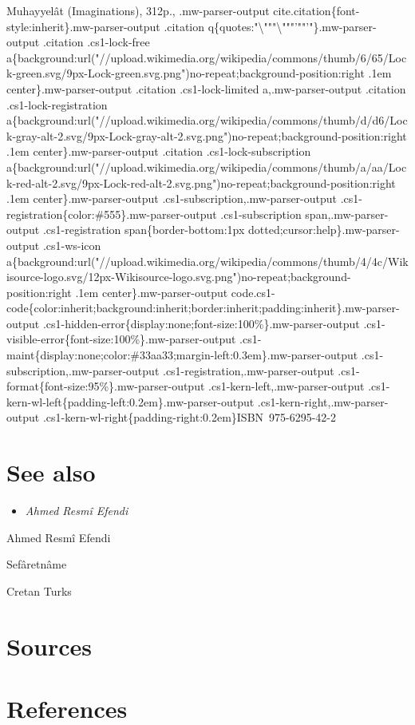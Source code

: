 Muhayyelât (Imaginations), 312p., .mw-parser-output
cite.citation\{font-style:inherit\}.mw-parser-output .citation
q\{quotes:"\textbackslash{}"""\textbackslash{}"""'""'"\}.mw-parser-output
.citation .cs1-lock-free
a\{background:url("//upload.wikimedia.org/wikipedia/commons/thumb/6/65/Lock-green.svg/9px-Lock-green.svg.png")no-repeat;background-position:right
.1em center\}.mw-parser-output .citation .cs1-lock-limited
a,.mw-parser-output .citation .cs1-lock-registration
a\{background:url("//upload.wikimedia.org/wikipedia/commons/thumb/d/d6/Lock-gray-alt-2.svg/9px-Lock-gray-alt-2.svg.png")no-repeat;background-position:right
.1em center\}.mw-parser-output .citation .cs1-lock-subscription
a\{background:url("//upload.wikimedia.org/wikipedia/commons/thumb/a/aa/Lock-red-alt-2.svg/9px-Lock-red-alt-2.svg.png")no-repeat;background-position:right
.1em center\}.mw-parser-output .cs1-subscription,.mw-parser-output
.cs1-registration\{color:\#555\}.mw-parser-output .cs1-subscription
span,.mw-parser-output .cs1-registration span\{border-bottom:1px
dotted;cursor:help\}.mw-parser-output .cs1-ws-icon
a\{background:url("//upload.wikimedia.org/wikipedia/commons/thumb/4/4c/Wikisource-logo.svg/12px-Wikisource-logo.svg.png")no-repeat;background-position:right
.1em center\}.mw-parser-output
code.cs1-code\{color:inherit;background:inherit;border:inherit;padding:inherit\}.mw-parser-output
.cs1-hidden-error\{display:none;font-size:100\%\}.mw-parser-output
.cs1-visible-error\{font-size:100\%\}.mw-parser-output
.cs1-maint\{display:none;color:\#33aa33;margin-left:0.3em\}.mw-parser-output
.cs1-subscription,.mw-parser-output .cs1-registration,.mw-parser-output
.cs1-format\{font-size:95\%\}.mw-parser-output
.cs1-kern-left,.mw-parser-output
.cs1-kern-wl-left\{padding-left:0.2em\}.mw-parser-output
.cs1-kern-right,.mw-parser-output
.cs1-kern-wl-right\{padding-right:0.2em\}ISBN~975-6295-42-2

\section{See also}\label{see-also}

\begin{itemize}
\item
  \emph{Ahmed Resmî Efendi}
\end{itemize}

Ahmed Resmî Efendi

Sefâretnâme

Cretan Turks

\section{Sources}\label{sources}

\section{References}\label{references}

